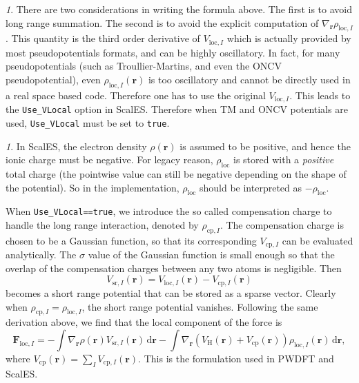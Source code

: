 \documentclass{article}
\newcommand{\bvec}[1]{\mathbf{#1}}
\newcommand{\vr}{\bvec{r}}
\newcommand{\vF}{\bvec{F}}
\newcommand{\ud}{\,\mathrm{d}}
\theoremstyle{plain}
\theoremstyle{remark}
\newtheorem{rem}[thm]{\protect\remarkname}
\theoremstyle{plain}
\theoremstyle{plain}
\theoremstyle{plain}
\providecommand{\remarkname}{Remark}
\begin{document}
\begin{rem}
There are two considerations in writing the formula above. The first is to avoid long range summation. The second is to avoid the explicit computation of $\nabla_\vr \rho_{\text{loc},I}$. This quantity is the third order derivative of $V_{\text{loc},I}$ which is actually provided by most pseudopotentials formats, and can be highly oscillatory.
In fact, for many pseudopotentials (such as Troullier-Martins, and even the ONCV pseudopotential), even $\rho_{\text{loc},I}(\vr)$ is too oscillatory and cannot be directly used in a real space based code. Therefore one has to use the original $V_{\text{loc},I}$. This leads to the \texttt{Use\_VLocal} option in ScalES. Therefore when TM and ONCV potentials are used, \texttt{Use\_VLocal} must be set to \texttt{true}.
\end{rem}

\begin{rem}
In ScalES, the electron density $\rho(\vr)$ is assumed to be positive, and hence the ionic charge must be negative. For legacy reason, $\rho_{\text{loc}}$ is stored with a  \textit{positive} total charge (the pointwise value can still be negative depending on the shape of the potential). So in the implementation, $\rho_{\text{loc}}$ should be interpreted as $-\rho_{\text{loc}}$. 
\end{rem}

When \texttt{Use\_VLocal==true}, we introduce the so called compensation charge to handle the long range interaction, denoted by $\rho_{\text{cp},I}$. The compensation charge is chosen to be a Gaussian function, so that its corresponding $V_{\text{cp},I}$ can be evaluated analytically. The $\sigma$ value of the Gaussian function is small enough so that the overlap of the compensation charges between any two atoms is negligible. Then 
\[
V_{\text{sr},I}(\vr)=V_{\text{loc},I}(\vr)-V_{\text{cp},I}(\vr)
\] 
becomes a short range potential that can be stored as a sparse vector. Clearly when $\rho_{\text{cp},I}=\rho_{\text{loc},I}$, the short range potential vanishes. Following the same derivation above, we find that the local component of the force is
\begin{equation}
\vF_{\text{loc},I}=- \int  \nabla_\vr \rho(\vr) V_{\text{sr},I}(\vr) \ud \vr-
    \int  \nabla_\vr (V_{\text{H}}(\vr)+V_{\text{cp}}(\vr)) \rho_{\text{loc},I}(\vr) \ud \vr,
\label{eqn:force_loc3}
\end{equation}
where $V_{\text{cp}}(\vr)=\sum_{I}V_{\text{cp},I}(\vr)$. This is the formulation used in PWDFT and ScalES. 
\end{document}
